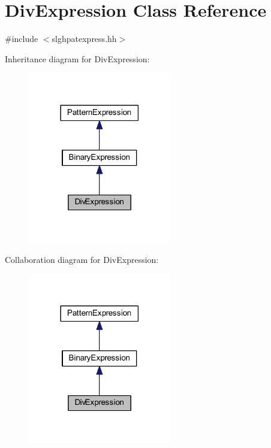 \hypertarget{class_div_expression}{}\section{Div\+Expression Class Reference}
\label{class_div_expression}


{\ttfamily \#include $<$slghpatexpress.\+hh$>$}



Inheritance diagram for Div\+Expression\+:
\nopagebreak
\begin{figure}[H]
\begin{center}
\leavevmode
\includegraphics[width=177pt]{class_div_expression__inherit__graph}
\end{center}
\end{figure}


Collaboration diagram for Div\+Expression\+:
\nopagebreak
\begin{figure}[H]
\begin{center}
\leavevmode
\includegraphics[width=177pt]{class_div_expression__coll__graph}
\end{center}
\end{figure}
